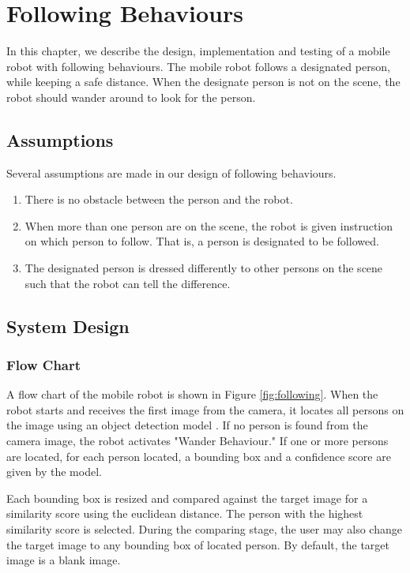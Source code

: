 \chapter{Following Behaviours}
\label{chap:following}

In this chapter, we describe the design, implementation and testing of a mobile robot with following behaviours.
The mobile robot follows a designated person, while keeping a safe distance.
When the designate person is not on the scene, the robot should wander around to look for the person.

\section{Assumptions}

Several assumptions are made in our design of following behaviours.

\begin{enumerate}
    \item There is no obstacle between the person and the robot.
    \item When more than one person are on the scene, the robot is given instruction on which person to follow. That is, a person is designated to be followed.
    \item The designated person is dressed differently to other persons on the scene such that the robot can tell the difference.
\end{enumerate}

\section{System Design}

\subsection{Flow Chart}

A flow chart of the mobile robot is shown in Figure \ref{fig:following}.
When the robot starts and receives the first image from the camera, it locates all persons on the image using an object detection model \citep{howard2017mobilenets,liu2016ssd}.
If no person is found from the camera image, the robot activates "Wander Behaviour."
If one or more persons are located, for each person located, a bounding box and a confidence score are given by the model.

Each bounding box is resized and compared against the target image for a similarity score using the euclidean distance.
The person with the highest similarity score is selected.
During the comparing stage, the user may also change the target image to any bounding box of located person.
By default, the target image is a blank image.

